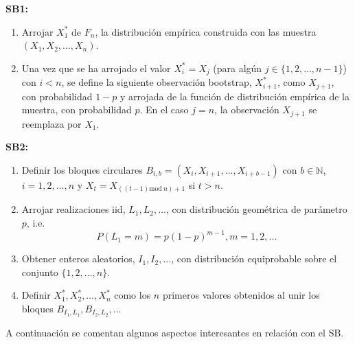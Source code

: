\documentclass[
]{book}
\theoremstyle{break}
\theoremstyle{nonumberplain}
\begin{document}
\textbf{SB1:}

\begin{enumerate}
\def\labelenumi{\arabic{enumi}.}
\item
  Arrojar \(X_1^{\ast}\) de \(F_n\), la distribución empírica
  construida con las muestra \((X_1,X_2,\ldots ,X_n).\)
\item
  Una vez que se ha arrojado el valor \(X_i^{\ast}=X_j\) (para
  algún \(j\in \{1,2,\ldots ,n-1\}\)) con \(i<n\), se define la siguiente
  observación bootstrap, \(X_{i+1}^{\ast}\), como \(X_{j+1}\), con
  probabilidad \(1-p\) y arrojada de la función de distribución empírica
  de la muestra, con probabilidad \(p\). En el caso \(j=n\), la
  observación \(X_{j+1}\) se reemplaza por \(X_1\).
\end{enumerate}

\textbf{SB2:}

\begin{enumerate}
\def\labelenumi{\arabic{enumi}.}
\item
  Definir los bloques circulares \(B_{i,b}=(X_i,X_{i+1},\ldots
  ,X_{i+b-1})\) con \(b\in \mathbb{N}\), \(i=1,2,\ldots ,n\) y
  \(X_{t}=X_{\left(\left( t-1 \right) \mathrm{mod\ }n \right) +1}\) si \(t>n\).
\item
  Arrojar realizaciones iid, \(L_1,L_2,\ldots\), con distribución
  geométrica de parámetro \(p\), i.e.
  \[P(L_1=m)=p(1-p)^{m-1},m=1,2,\ldots\]
\item
  Obtener enteros aleatorios, \(I_1,I_2,\ldots\), con distribución
  equiprobable sobre el conjunto \(\{1,2,\ldots ,n\}\).
\item
  Definir \(X_1^{\ast},X_2^{\ast},\ldots ,X_n^{\ast}\) como los
  \(n\) primeros valores obtenidos al unir los bloques
  \(B_{I_1,L_1},B_{I_2,L_2},\ldots\)
\end{enumerate}

A continuación se comentan algunos aspectos interesantes en relación con
el SB.
\end{document}
